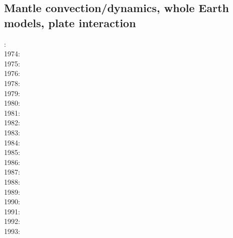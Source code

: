 \subsection{Mantle convection/dynamics, whole Earth models, plate interaction}

{\scriptsize
{}: \cite{pelt72}\\
1974: \cite{youn74}\\
1975: \cite{hemw75}\cite{buss75}\\
1976: \cite{mcri76}\\
1978: \cite{mahz78}\cite{hsui78}\cite{haoc78}\\
1979: \cite{ludt79}\cite{buss79}\cite{shpe79}\\
1980: \cite{olco80}\cite{jamc80}\cite{scsc80}\cite{zess80}\\
1981: \cite{buss81}\cite{jasc81}\cite{haoc81}\\
1982: \cite{jape82}\cite{homc82}\cite{buri82}\\
1983: \cite{hous83}\cite{hous83b}\cite{chri83}\cite{mcke83}\cite{chri83b}\cite{zesd83}\\
1984: \cite{olyb84}\cite{jarv84}\cite{haeb84}\cite{harp84}\cite{davi84}\cite{boas84}\cite{chri84}
      \cite{moca84}\cite{flyu84}\\
1985: \cite{jarv85}\cite{baum85}\cite{chri85}\cite{csra85}\cite{scan85}\\
1986: \cite{davi86}\cite{guda86}\cite{quys86}\\
1987: \cite{yuqh87}\\
1988: \cite{haeb88}\cite{glat88}\\
1989: \cite{besg89}\cite{schm89}\cite{sthe89}\\
1990: \cite{trab90}\cite{gurn90}\cite{ketu90}\cite{sope90}\\
1991: \cite{chha91}\cite{mawe91}\cite{gaot91}\cite{vayv91}\cite{hayk91}\\
1992: \cite{besg92}\cite{mayw92}\cite{vayv92}\cite{chri92}\cite{haym92}\\
1993: \cite{zhch93}\cite{jarv93}\cite{tack93}\cite{bucc93}\cite{carm93}\cite{vavy93}\cite{tasg93}
      \cite{zhgu93}\cite{mamc93}\cite{zebi93}\cite{vayv93}\cite{hayk93}\cite{hayu93}\\
}
